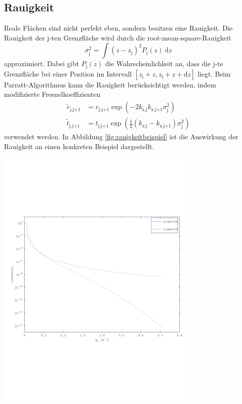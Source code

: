 \documentclass[captions=tableheading]{scrartcl}
\newcommand{\indx}[1]{\text{#1}}
\begin{document}
\subsection{Rauigkeit}
Reale Flächen sind nicht perfekt eben, sondern besitzen eine Rauigkeit.
Die Rauigkeit der j-ten Grenzfläche wird durch die root-mean-square-Rauigkeit
\begin{equation}
\sigma_\indx{j}^2=\int \left(z-z_\indx{j} \right)^2 P_\indx{j}\left(z\right)~\mathrm{d}z
\end{equation}
approximiert.
Dabei gibt $P_\indx{j}\left(z\right)$ die Wahrscheinlichkeit an, dass die j-te Grenzfläche bei einer Position im Intervall $\left[z_\indx{j}+ z, z_\indx{j}+ z+\mathrm{d}z \right]$ liegt.
Beim Parratt-Algorithmus kann die Rauigkeit berücksichtigt werden, indem modifizierte Fresnelkoeffizienten
\begin{align}
\tilde{r}_\indx{j,j+1}&=r_\indx{j,j+1}\exp\left( -2k_\indx{z,j}k_\indx{z,j+1}\sigma_\indx{j}^2 \right) \\
\tilde{t}_\indx{j,j+1}&=t_\indx{j,j+1}\exp\left( \frac{1}{2}\left(k_\indx{z,j}-k_\indx{z,j+1}\right)\sigma_\indx{j}^2 \right)
\end{align}
verwendet werden. In Abbildung \ref{fig:rauigkeitbeispiel} ist die Auswirkung der Rauigkeit an einen konkreten Beispiel dargestellt.

\begin{center}
	\includegraphics[width=10cm]{images/reflektivitaet_rau.pdf}
	\label{fig:rauigkeitbeispiel}
\end{center}
\end{document}
